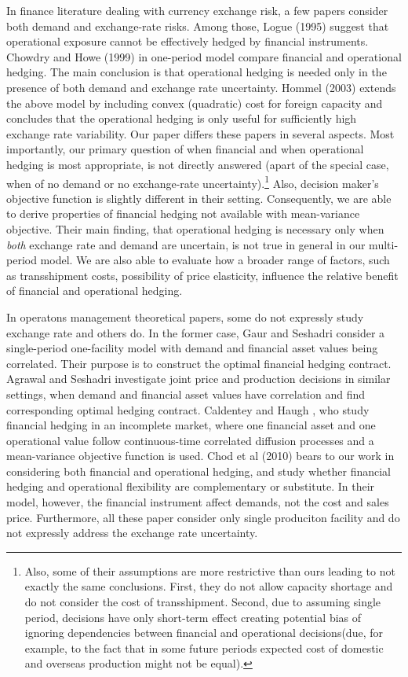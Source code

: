 \documentclass[mnsc,nonblindrev,copyedit]{informs2_wz} %
\begin{document}
In finance literature dealing with currency exchange risk, a few papers consider both demand and exchange-rate risks.  
Among those, Logue (1995) suggest that operational exposure cannot be effectively hedged by financial instruments. 
Chowdry and Howe (1999) in one-period model compare financial and operational hedging.  The main conclusion is that operational hedging is needed only in the presence of both demand and exchange rate uncertainty.
Hommel (2003) extends the above model by including convex (quadratic) cost for foreign capacity and concludes that the operational hedging is only useful for sufficiently high exchange rate variability. Our paper differs these papers in several aspects.  Most importantly, our primary question of when financial and when operational hedging is most appropriate, is not directly answered (apart of the special case, when of no demand or no exchange-rate uncertainty).\footnote{Also, some of their assumptions are more restrictive than ours leading to not exactly the same conclusions.  First, they do not allow capacity shortage and do not consider the cost of transshipment.  Second, due to assuming single period, decisions have only short-term effect creating potential bias of ignoring dependencies between financial and operational decisions(due, for example, to the fact that in some future periods expected cost of domestic and overseas production might not be equal).}  Also, decision maker's objective function is slightly different in their setting.  Consequently, we are able to derive properties of financial hedging not available with mean-variance objective.  Their main finding, that operational hedging is necessary only when {\em both} exchange rate and demand are uncertain, is not true in general in our multi-period model.  We are also able to evaluate how a broader range of factors, such as transshipment costs, possibility of price elasticity, influence the relative benefit of financial and operational hedging.

In operatons management theoretical papers, some do not expressly study exchange rate and others do. In the former case, Gaur and Seshadri \cite{Guar2004} consider a single-period one-facility model with demand and financial asset values being correlated.  Their purpose is to construct the optimal financial hedging contract.  Agrawal and Seshadri \cite{Agrawal2000} investigate joint price and production decisions in similar settings, when demand and financial asset values have correlation and find corresponding optimal hedging contract. Caldentey and Haugh \cite{Caldentey}, who study financial hedging in an incomplete market, where one financial asset and one operational value follow continuous-time correlated diffusion processes and a mean-variance objective function is used.  Chod et al (2010) bears to our work in considering both financial and operational hedging, and study whether financial hedging and operational flexibility are complementary or substitute. In their model, however, the financial instrument affect demands, not the cost and sales price. Furthermore, all these paper consider only single produciton facility and do not expressly address the exchange rate uncertainty.
\end{document}
